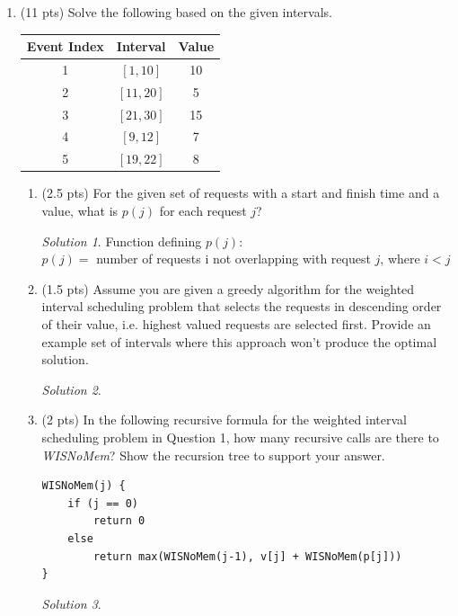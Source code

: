 \documentclass[12pt]{article}
\theoremstyle{remark}
\newtheorem*{solution}{Solution}
\begin{document}
\begin{enumerate}

\item (11 pts) Solve the following based on the given intervals.
\begin{center}
\begin{tabular}{c|c|c}
Event Index & Interval & Value\\ \hline
1 & $[1, 10]$ & 10\\ 
2 & $[11, 20]$  & 5\\
3 & $[21, 30]$  & 15\\
4 & $[9, 12]$ & 7\\
5 & $[19, 22]$ & 8
\end{tabular}
\end{center}

\begin{enumerate}

\item (2.5 pts) For the given set of requests with a start and finish time and a value, what is $p(j)$ for each request $j$?

\begin{solution}Function defining $p(j)$: \\
$p(j) =$ number of requests i not overlapping with request $j$, where $i < j$
\end{solution}

\item (1.5 pts) Assume you are given a greedy algorithm for the weighted interval scheduling problem that selects the requests in descending order of their value, i.e. highest valued requests are selected first. Provide an example set of intervals where this approach won't produce the optimal solution.
\begin{solution}

\end{solution}

\pagebreak
\item (2 pts) In the following recursive formula for the weighted interval scheduling problem in Question 1, how many recursive calls are there to \textit{WISNoMem}? Show the recursion tree to support your answer.
\begin{verbatim}
WISNoMem(j) {
    if (j == 0) 
        return 0
    else 
        return max(WISNoMem(j-1), v[j] + WISNoMem(p[j]))
}
\end{verbatim}

\begin{solution}

\end{solution}


\end{enumerate}
\end{enumerate}
\end{document}
